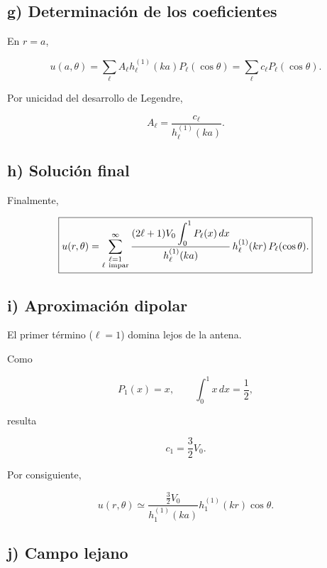 \documentclass[11pt,spanish]{article}
\begin{document}

\subsection*{g) Determinación de los coeficientes}

En \(r=a\),

\[
u(a,\theta)
=
\sum_{\ell}
A_\ell
h_\ell^{(1)}(ka)
P_\ell(\cos\theta)
=
\sum_{\ell}
c_\ell
P_\ell(\cos\theta).
\]

Por unicidad del desarrollo de Legendre,

\[
A_\ell
=
\frac{c_\ell}
     {h_\ell^{(1)}(ka)}.
\]


\subsection*{h) Solución final}

Finalmente,

\[
\boxed{
u(r,\theta)
=
\sum_{\substack{\ell=1\\ \ell\ {\rm impar}}}^{\infty}
\frac{
(2\ell+1)V_0
\displaystyle\int_0^1 P_\ell(x)\,dx
}{
h_\ell^{(1)}(ka)
}
\,h_\ell^{(1)}(kr)
\,P_\ell(\cos\theta).
}
\]


\subsection*{i) Aproximación dipolar}

El primer término (\(\ell=1\)) domina lejos de la antena.

Como

\[
P_1(x)=x,
\qquad
\int_0^1x\,dx=\frac12,
\]

resulta

\[
c_1=\frac32V_0.
\]

Por consiguiente,

\[
u(r,\theta)
\simeq
\frac{\frac32V_0}
     {h_1^{(1)}(ka)}
h_1^{(1)}(kr)
\cos\theta.
\]


\subsection*{j) Campo lejano}
\end{document}

